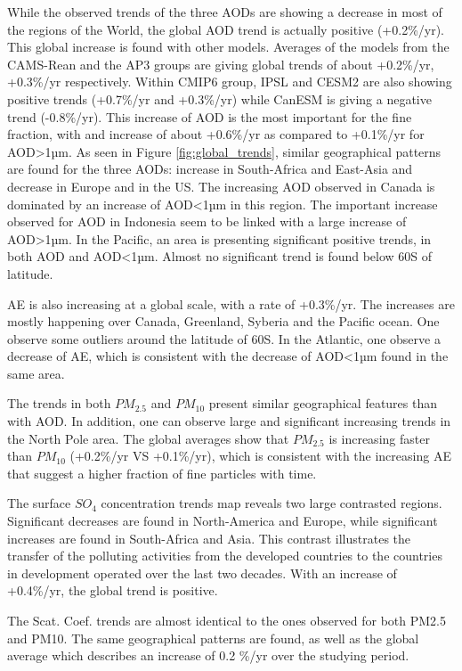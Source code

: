 \documentclass[journal abbreviation, manuscript]{copernicus}
\begin{document}
While the observed trends of the three AODs are showing a decrease in most of the regions of the World, the global AOD trend is actually positive (+0.2\%/yr). This global increase is found with other models. Averages of the models from the CAMS-Rean and the AP3 groups are giving global trends of about +0.2\%/yr, +0.3\%/yr respectively. Within CMIP6 group, IPSL and CESM2 are also showing positive trends (+0.7\%/yr and +0.3\%/yr) while CanESM is giving a negative trend (-0.8\%/yr).
This increase of AOD is the most important for the fine fraction, with and increase of about +0.6\%/yr as compared to +0.1\%/yr for AOD>1µm. As seen in Figure \ref{fig:global_trends}, similar geographical patterns are found for the three AODs: increase in South-Africa and East-Asia and decrease in Europe and in the US. The increasing AOD observed in Canada is dominated by an increase of AOD<1µm in this region. The important increase observed for AOD in Indonesia seem to be linked with a large increase of AOD>1µm. In the Pacific, an area is presenting significant positive trends, in both AOD and AOD<1µm. Almost no significant trend is found below 60\textdegree S of latitude.

AE is also increasing  at a global scale, with a rate of +0.3\%/yr. The increases are mostly happening over Canada, Greenland, Syberia and the Pacific ocean. One observe some outliers around the latitude of 60\textdegree S. In the Atlantic, one observe a decrease of AE, which is consistent with the decrease of AOD<1µm found in the same area.

The trends in both $PM_{2.5}$ and $PM_{10}$ present similar geographical features than with AOD. In addition, one can observe large and significant increasing trends in the North Pole area. The global averages show that $PM_{2.5}$ is increasing faster than $PM_{10}$  (+0.2\%/yr VS +0.1\%/yr), which is consistent with the increasing AE that suggest a higher fraction of fine particles with time.

The surface $SO_{4}$ concentration trends map reveals two large contrasted regions. Significant decreases are found in North-America and Europe, while significant increases are found in South-Africa and Asia. This contrast illustrates the transfer of the polluting activities from the developed countries to the countries in development operated over the last two decades. With an increase of +0.4\%/yr, the global trend is positive.

The Scat. Coef. trends are almost identical to the ones observed for both PM2.5 and PM10. The same geographical patterns are found, as well as the global average which describes an increase of 0.2 \%/yr over the studying period.
\end{document}
